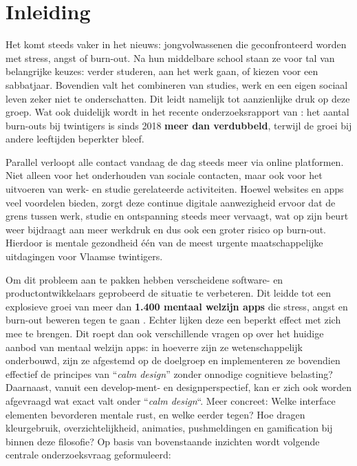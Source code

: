 \vspace{1em}

\section{Inleiding}%
\label{sec:inleiding}

\vspace{1em}

Het komt steeds vaker in het nieuws: jongvolwassenen die geconfronteerd worden met stress, angst of burn-out. Na hun middelbare school staan ze voor tal van belangrijke keuzes: verder studeren, aan het werk gaan, of kiezen voor een sabbatjaar. Bovendien valt het combineren van studies, werk en een eigen sociaal leven zeker niet te onderschatten. Dit leidt namelijk tot aanzienlijke druk op deze groep. Wat ook duidelijk wordt in het recente onderzoeksrapport van \textcite{RIZIV2023_invaliditeit_burnout}: het aantal burn-outs bij twintigers is sinds 2018 \textbf{meer dan verdubbeld}, terwijl de \newline groei bij andere leeftijden beperkter bleef. 

\vspace{1em}

Parallel verloopt alle contact vandaag de dag steeds meer via online platformen. Niet alleen voor het onderhouden van sociale contacten, maar ook voor het uitvoeren van werk- en studie gerelateerde activiteiten. Hoewel websites en apps veel voordelen bieden, zorgt deze continue digitale aanwezigheid ervoor dat de grens tussen werk, studie en ontspanning steeds meer vervaagt, wat op zijn beurt weer bijdraagt aan meer werkdruk en dus ook een groter risico op burn-out. Hierdoor is mentale gezondheid één van de meest urgente maatschappelijke uitdagingen voor Vlaamse twintigers.

\vspace{1em}

Om dit probleem aan te pakken hebben verscheidene software- en productontwikkelaars geprobeerd de situatie te verbeteren. Dit leidde tot een explosieve groei van meer dan \textbf{1.400 mentaal welzijn apps} die stress, angst en burn-out beweren tegen te gaan \autocite{Larsen2019}. Echter lijken deze een beperkt effect met zich mee te brengen. Dit roept dan ook verschillende vragen op over het huidige aanbod van mentaal welzijn apps: in hoeverre zijn ze wetenschappelijk onderbouwd, zijn ze afgestemd op de doelgroep en implementeren ze bovendien effectief de principes van ``\emph{calm design}'' zonder onnodige cognitieve belasting? Daarnaast, vanuit een develop-ment- en designperspectief, kan er zich ook worden afgevraagd wat exact valt onder ``\emph{calm design}``. Meer concreet: Welke interface elementen bevorderen mentale rust, en welke eerder tegen? Hoe dragen kleurgebruik, overzichtelijkheid, animaties, pushmeldingen en gamification bij binnen deze filosofie? Op basis van bovenstaande inzichten wordt volgende centrale onderzoeksvraag geformuleerd: 

